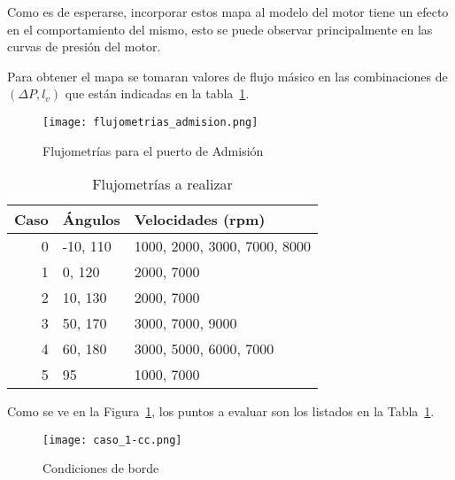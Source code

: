 Como es de esperarse, incorporar estos mapa al modelo del motor tiene un efecto
en el comportamiento del mismo, esto se puede observar principalmente en las
curvas de presión del motor.

%
Para obtener el mapa se tomaran valores de flujo másico en las combinaciones de
$(\Delta P, l_v)$ que están indicadas en la tabla~\ref{tab:casos}.
%
%

\begin{figure}
    \centering
    \texttt{[image: flujometrias\_admision.png]}
    \caption{Flujometrías para el puerto de Admisión}\label{fig:flujometrias}
\end{figure}

\begin{table}
    \centering
    \begin{tabular}{rll} \toprule
        Caso & Ángulos  & Velocidades (rpm) \\ \midrule
        0    & -10, 110 & 1000, 2000, 3000, 7000, 8000 \\
        1    & 0, 120   & 2000, 7000 \\
        2    & 10, 130  & 2000, 7000 \\
        3    & 50, 170  & 3000, 7000, 9000 \\
        4    & 60, 180  & 3000, 5000, 6000, 7000 \\
        5    & 95       & 1000, 7000\\ \bottomrule
    \end{tabular}
    \caption{Flujometrías a realizar}\label{tab:casos}
\end{table}

Como se ve en la Figura~\ref{fig:flujometrias}, los puntos a evaluar son los
listados en la Tabla~\ref{tab:casos}.



\begin{figure}[h]
    \texttt{[image: caso\_1-cc.png]}
    \caption{Condiciones de borde}\label{fig:geom}
\end{figure}

